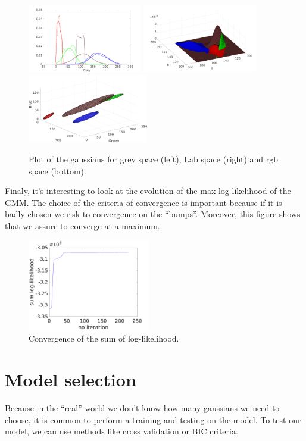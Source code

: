 \documentclass[runningheads,a4paper]{llncs}
\begin{document}
\begin{figure}
\centering
\includegraphics[height=3cm]{Figures/plot_1carac}
\includegraphics[height=3cm]{Figures/plot_2carac}
\includegraphics[height=3cm]{Figures/plot_3carac}
\caption{Plot of the gaussians for grey space (left), Lab space (right) and rgb space (bottom).}
\end{figure}

\par Finaly, it's interesting to look at the evolution of the max log-likelihood of the GMM. The choice of the criteria of convergence is important because if it is badly chosen we risk to convergence on the ``bumps''. Moreover, this figure shows that we assure to converge at a maximum.

\begin{figure}
\centering
\includegraphics[height=4cm]{Figures/likelihood}
\caption{Convergence of the sum of log-likelihood.}
\end{figure}
 
\section{Model selection}\label{sec:modelselection}
Because in the ``real'' world we don't know how many gaussians we need to choose, it is common to perform a training and testing on the model. To test our model, we can use methods like cross validation or BIC criteria.
\end{document}
